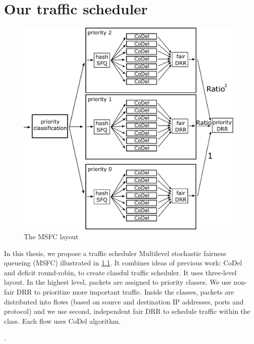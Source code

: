\chapter{Our traffic scheduler}
\label{chap02}

\begin{figure}
	\centering
	\includegraphics[width=137mm]{drawings/msfc}
	\caption{The MSFC layout}
	\label{fig10:msfc}
\end{figure}

In this thesis, we propose a traffic scheduler Multilevel stochastic fairness queueing (MSFC) illustrated in \ref{fig10:msfc}. It combines ideas of previous work: CoDel and deficit round-robin, to create classful traffic scheduler. It uses three-level layout. In the highest level, packets are assigned to priority classes. We use non-fair DRR to prioritize more important traffic. Inside the classes, packets are distributed into flows (based on source and destination IP addresses, ports and protocol) and we use second, independent fair DRR to schedule traffic within the class. Each flow uses CoDel algorithm.

. 

